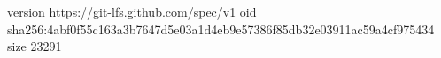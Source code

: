 version https://git-lfs.github.com/spec/v1
oid sha256:4abf0f55c163a3b7647d5e03a1d4eb9e57386f85db32e03911ac59a4cf975434
size 23291
